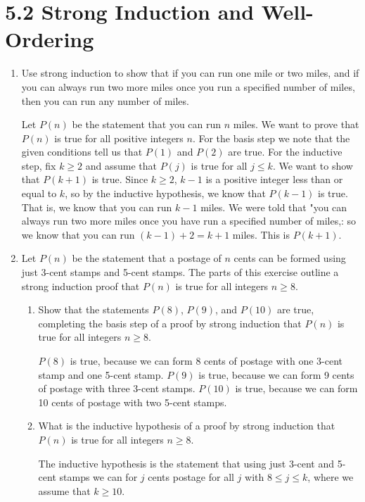 \documentclass[11pt]{article}
\begin{document}
\section*{\textbf{5.2 Strong Induction and Well-Ordering}}
\begin{enumerate}[label=\textbf{\arabic*.}]
	\item Use strong induction to show that if you can run one mile or two miles, and if you can always run two more miles once you run a specified number of miles, then you can run any number of miles.
	
	Let $P(n)$ be the statement that you can run $n$ miles. We want to prove that $P(n)$ is true for all positive integers $n$. For the basis step we note that the given conditions tell us that $P(1)$ and $P(2)$ are true. For the inductive step, fix $k \geq 2$ and assume that $P(j)$ is true for all $j \leq k$. We want to show that $P(k + 1)$ is true. Since $k \geq 2$, $k - 1$ is a positive integer less than or equal to $k$, so by the inductive hypothesis, we know that $P(k - 1)$ is true. That is, we know that you can run $k - 1$ miles. We were told that "you can always run two more miles once you have run a specified number of miles,: so we know that you can run $(k - 1) + 2 = k + 1$ miles. This is $P(k + 1)$.
	
	\item Let $P(n)$ be the statement that a postage of $n$ cents can be formed using just 3-cent stamps and 5-cent stamps. The parts of this exercise outline a strong induction proof that $P(n)$ is true for all integers $n \geq 8$.
	
	\begin{enumerate}[label=\textbf{\alph*)}]
		\item Show that the statements $P(8)$, $P(9)$, and $P(10)$ are true, completing the basis step of a proof by strong induction that $P(n)$ is true for all integers $n \geq 8$.
		
		$P(8)$ is true, because we can form 8 cents of postage with one 3-cent stamp and one 5-cent stamp. $P(9)$ is true, because we can form 9 cents of postage with three 3-cent stamps. $P(10)$ is true, because we can form 10 cents of postage with two 5-cent stamps.
		
		\item What is the inductive hypothesis of a proof by strong induction that $P(n)$ is true for all integers $n \geq 8$.
		
		The inductive hypothesis is the statement that using just 3-cent and 5-cent stamps we can for $j$ cents postage for all $j$ with $8 \leq j \leq k$, where we assume that $k \geq 10$.
		

\end{enumerate}
\end{enumerate}
\end{document}

